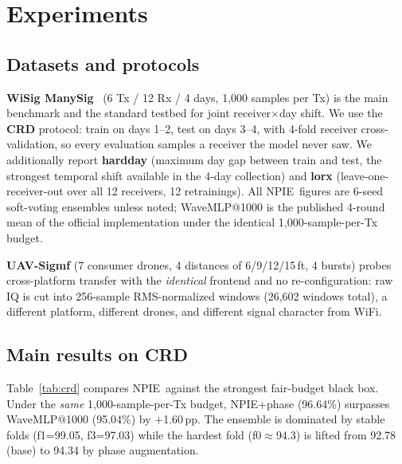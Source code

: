 \documentclass[journal]{IEEEtran}
\newcommand{\npie}{\textsc{NPIE}}
\begin{document}
\section{Experiments}
\label{sec:exp}
\subsection{Datasets and protocols}
\label{sec:data}
\textbf{WiSig ManySig}~\cite{wisig2022} (6 Tx / 12 Rx / 4 days, 1{,}000 samples per Tx) is the main benchmark and the standard testbed for joint receiver$\times$day shift. We use the \textbf{CRD} protocol: train on days 1--2, test on days 3--4, with 4-fold receiver cross-validation, so every evaluation samples a receiver the model never saw. We additionally report \textbf{hardday} (maximum day gap between train and test, the strongest temporal shift available in the 4-day collection) and \textbf{lorx} (leave-one-receiver-out over all 12 receivers, 12 retrainings). All \npie\ figures are 6-seed soft-voting ensembles unless noted; WaveMLP@1000 is the published 4-round mean of the official implementation under the identical 1{,}000-sample-per-Tx budget.

\textbf{UAV-Sigmf} (7 consumer drones, 4 distances of 6/9/12/15\,ft, 4 bursts) probes cross-platform transfer with the \emph{identical} frontend and no re-configuration: raw IQ is cut into 256-sample RMS-normalized windows (26{,}602 windows total), a different platform, different drones, and different signal character from WiFi.

\subsection{Main results on CRD}
\label{sec:main}
Table~\ref{tab:crd} compares \npie\ against the strongest fair-budget black box. Under the \emph{same} 1{,}000-sample-per-Tx budget, \npie+phase (96.64\%) surpasses WaveMLP@1000 (95.04\%) by +1.60\,pp. The ensemble is dominated by stable folds (f1=99.05, f3=97.03) while the hardest fold (f0$\approx$94.3) is lifted from 92.78 (base) to 94.34 by phase augmentation.
\end{document}
